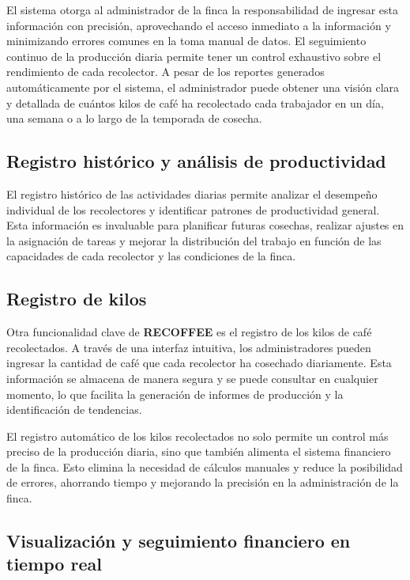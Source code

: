 \documentclass[a4paper,12pt]{article}
\begin{document}
El sistema otorga al administrador de la finca la responsabilidad de ingresar esta información con precisión, aprovechando el acceso inmediato a la información y minimizando errores comunes en la toma manual de datos. El seguimiento continuo de la producción diaria permite tener un control exhaustivo sobre el rendimiento de cada recolector. A pesar de los reportes generados automáticamente por el sistema, el administrador puede obtener una visión clara y detallada de cuántos kilos de café ha recolectado cada trabajador en un día, una semana o a lo largo de la temporada de cosecha.

\subsection*{Registro histórico y análisis de productividad}

El registro histórico de las actividades diarias permite analizar el desempeño individual de los recolectores y identificar patrones de productividad general. Esta información es invaluable para planificar futuras cosechas, realizar ajustes en la asignación de tareas y mejorar la distribución del trabajo en función de las capacidades de cada recolector y las condiciones de la finca.

\subsection*{Registro de kilos}

Otra funcionalidad clave de \textbf{RECOFFEE} es el registro de los kilos de café recolectados. A través de una interfaz intuitiva, los administradores pueden ingresar la cantidad de café que cada recolector ha cosechado diariamente. Esta información se almacena de manera segura y se puede consultar en cualquier momento, lo que facilita la generación de informes de producción y la identificación de tendencias.

El registro automático de los kilos recolectados no solo permite un control más preciso de la producción diaria, sino que también alimenta el sistema financiero de la finca. Esto elimina la necesidad de cálculos manuales y reduce la posibilidad de errores, ahorrando tiempo y mejorando la precisión en la administración de la finca.

\subsection*{Visualización y seguimiento financiero en tiempo real}
\end{document}
